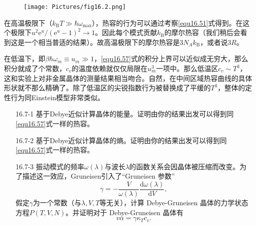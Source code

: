 \begin{figure}
\centering
\texttt{[image: Pictures/fig16.2.png]}
\label{fig16.2}
\end{figure}

在高温极限下（$k_\text{B}T\gg\hbar\omega_{\max}$），热容的行为可以通过考察\eqref{equ16.51}式得到。在这个极限下$u^2\mathrm e^u/(\mathrm e^u-1)^2\rightarrow 1$。因此每个模式贡献$k_\text{B}$的摩尔热容（我们稍后会看到这是一个相当普适的结果）。故高温极限下的摩尔热容是$3N_Ak_\text{B}$，或者说$3R$。

在低温下，即$\beta\hbar\omega_m\equiv u_m\gg 1$，\eqref{equ16.57}式的积分上界可以近似成无穷大，那么积分就成了个常数，$c_v$的温度依赖就仅仅局限在$u_m^3$一项中。那么低温区$c_v\sim T^3$，这和实验上对非金属晶体的测量结果相当吻合。自然，在中间区域热容曲线的具体形状就不那么精确了。除了低温区的尖锐指数行为被替换成了平缓的$T^3$，整体的定性行为同Einstein模型非常类似。

\begin{itemize}
\item[16.7-1] 基于Debye近似计算晶体的能量。证明由你的结果出发可以得到同\eqref{equ16.57}式一样的热容。
\item[16.7-2] 基于Debye近似计算晶体的熵。证明由你的结果出发可以得到同\eqref{equ16.57}式一样的热容。
\item[16.7-3] 振动模式的频率$\omega(\lambda)$与波长$\lambda$的函数关系会因晶体被压缩而改变。为了描述这一效应，Gruneisen引入了``Gruneisen 参数''
\begin{equation*}
\gamma = -\frac{V}{\omega(\lambda)}\frac{\mathrm d\omega(\lambda)}{\mathrm dV},
\end{equation*}
假定$\gamma$为一个常数（与$\lambda,V,T$等无关），计算 Debye-Gruneisen 晶体的力学状态方程$P(T,V,N)$。并证明对于 Debye-Gruneisen 晶体有
\begin{equation*}
v\alpha = \gamma\kappa_Tc_v.
\end{equation*}
\end{itemize}
